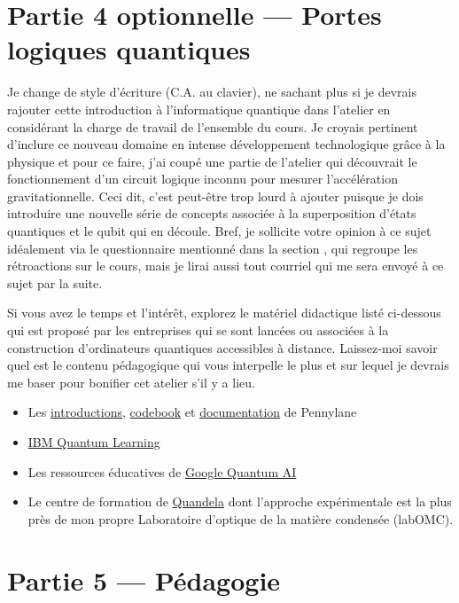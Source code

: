 \documentclass[canadien,12pt,oneside,letterpaper]{article}
\begin{document}
\section{Partie 4 optionnelle --- Portes logiques quantiques}

Je change de style d'écriture (C.A. au clavier), ne sachant plus si je devrais rajouter cette introduction à l'informatique quantique dans l'atelier en considérant la charge de travail de l'ensemble du cours. Je croyais pertinent d'inclure ce nouveau domaine en intense développement technologique grâce à la physique et pour ce faire, j'ai coupé une partie de l'atelier qui découvrait le fonctionnement d'un circuit logique inconnu pour mesurer l'accélération gravitationnelle. Ceci dit, c'est peut-être trop lourd à ajouter puisque je dois introduire une nouvelle série de concepts associée à la superposition d'états quantiques et le qubit qui en découle. Bref, je sollicite votre opinion à ce sujet idéalement via le questionnaire mentionné dans la section , qui regroupe les rétroactions sur le cours, mais je lirai aussi tout courriel qui me sera envoyé à ce sujet par la suite.

Si vous avez le temps et l'intérêt, explorez le matériel didactique listé ci-dessous qui est proposé par les entreprises qui se sont lancées ou associées à la construction d'ordinateurs quantiques accessibles à distance. Laissez-moi savoir quel est le contenu pédagogique qui vous interpelle le plus et sur lequel je devrais me baser pour bonifier cet atelier s'il y a lieu.

\begin{itemize}
    \item Les \href{https://pennylane.ai/qml/quantum-computing}{introductions}, \href{https://pennylane.ai/codebook}{codebook} et \href{https://docs.pennylane.ai/en/stable/}{documentation} de Pennylane
    \item \href{https://learning.quantum.ibm.com/catalog/courses}{IBM Quantum Learning}
    \item Les ressources éducatives de \href{https://quantumai.google/resources}{Google Quantum AI}
    \item Le centre de formation de \href{https://www.quandela.com/products-and-services/training-center/}{Quandela} dont l'approche expérimentale est la plus près de mon propre Laboratoire d'optique de la matière condensée (labOMC).
\end{itemize}


\section{Partie 5 --- Pédagogie}\label{sec:pedago}
\end{document}
